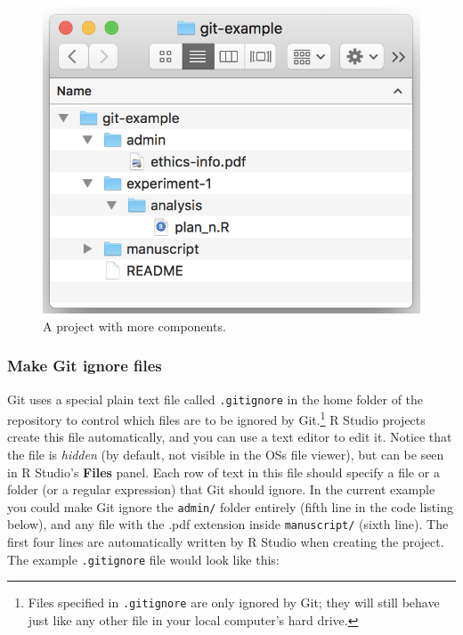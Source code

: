\documentclass[
  american,
  ,doc,floatsintext]{apa6}
\begin{document}
\begin{figure}

{\centering \includegraphics{images/advanced-project} 

}

\caption{A project with more components.}\label{fig:advanced-project}
\end{figure}

\hypertarget{make-git-ignore-files}{%
\subsubsection{Make Git ignore files}\label{make-git-ignore-files}}

Git uses a special plain text file called \texttt{.gitignore} in the home folder of the repository to control which files are to be ignored by Git.\footnote{Files specified in \texttt{.gitignore} are only ignored by Git; they will still behave just like any other file in your local computer's hard drive.} R Studio projects create this file automatically, and you can use a text editor to edit it. Notice that the file is \emph{hidden} (by default, not visible in the OSs file viewer), but can be seen in R Studio's \textbf{Files} panel. Each row of text in this file should specify a file or a folder (or a regular expression) that Git should ignore. In the current example you could make Git ignore the \texttt{admin/} folder entirely (fifth line in the code listing below), and any file with the .pdf extension inside \texttt{manuscript/} (sixth line). The first four lines are automatically written by R Studio when creating the project. The example \texttt{.gitignore} file would look like this:
\end{document}
